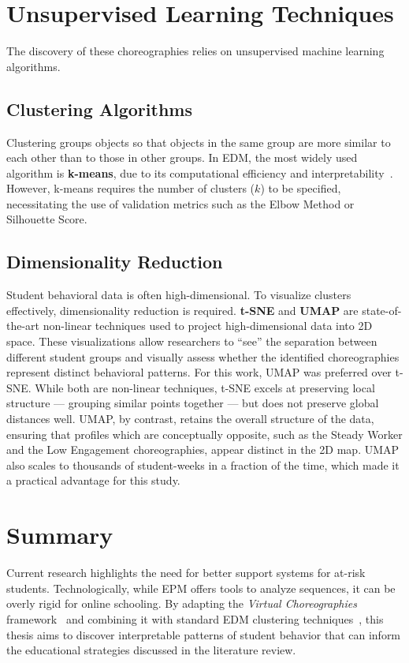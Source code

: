 \section{Unsupervised Learning Techniques}
\label{sec:algorithms}
The discovery of these choreographies relies on unsupervised machine learning algorithms.

\subsection{Clustering Algorithms}
Clustering groups objects so that objects in the same group are more similar to each other than to those in other groups.
In EDM, the most widely used algorithm is \textbf{k-means}, due to its computational efficiency and interpretability~\cite{romero_edm_survey}.
However, k-means requires the number of clusters ($k$) to be specified, necessitating the use of validation metrics such as the Elbow Method or Silhouette Score.

\subsection{Dimensionality Reduction}
Student behavioral data is often high-dimensional. To visualize clusters effectively, dimensionality reduction is required.
\textbf{t-SNE} and \textbf{UMAP} are state-of-the-art non-linear techniques used to project high-dimensional data into 2D space.
These visualizations allow researchers to ``see'' the separation between different student groups and visually assess whether the identified choreographies represent distinct behavioral patterns.
For this work, UMAP was preferred over t-SNE. While both are non-linear techniques, t-SNE excels at preserving local structure — grouping similar points together — but does not preserve global distances well. UMAP, by contrast, retains the overall structure of the data, ensuring that profiles which are conceptually opposite, such as the Steady Worker and the Low Engagement choreographies, appear distinct in the 2D map. UMAP also scales to thousands of student-weeks in a fraction of the time, which made it a practical advantage for this study.

\section{Summary}
Current research highlights the need for better support systems for at-risk students.
Technologically, while EPM offers tools to analyze sequences, it can be overly rigid for online schooling.
By adapting the \textit{Virtual Choreographies} framework~\cite{cassola_using_2022} and combining it with standard EDM clustering techniques~\cite{romero_edm_survey}, this thesis aims to discover interpretable patterns of student behavior that can inform the educational strategies discussed in the literature review.